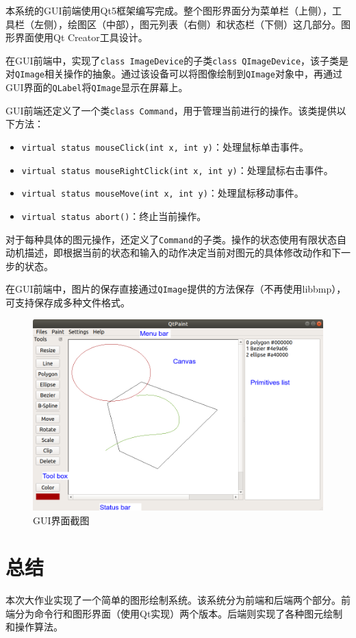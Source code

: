 \documentclass[a4paper,12pt]{article}
\begin{document}
本系统的GUI前端使用Qt5框架\cite{qtdoc}编写完成。整个图形界面分为菜单栏（上侧），工具栏（左侧），绘图区（中部），图元列表（右侧）和状态栏（下侧）这几部分。图形界面使用Qt Creator工具设计。

在GUI前端中，实现了\lstinline|class ImageDevice|的子类\lstinline|class QImageDevice|，该子类是对\lstinline|QImage|相关操作的抽象。通过该设备可以将图像绘制到\lstinline|QImage|对象中，再通过GUI界面的\lstinline|QLabel|将\lstinline|QImage|显示在屏幕上。

GUI前端还定义了一个类\lstinline|class Command|，用于管理当前进行的操作。该类提供以下方法：
\begin{itemize}
	\item \lstinline|virtual status mouseClick(int x, int y)|：处理鼠标单击事件。
	\item \lstinline|virtual status mouseRightClick(int x, int y)|：处理鼠标右击事件。
	\item \lstinline|virtual status mouseMove(int x, int y)|：处理鼠标移动事件。
	\item \lstinline|virtual status abort()|：终止当前操作。
\end{itemize}

对于每种具体的图元操作，还定义了\lstinline|Command|的子类。操作的状态使用有限状态自动机描述，即根据当前的状态和输入的动作决定当前对图元的具体修改动作和下一步的状态。

在GUI前端中，图片的保存直接通过\lstinline|QImage|提供的方法保存（不再使用libbmp），可支持保存成多种文件格式。

\begin{figure}[htb]
\centering
\includegraphics[width=\linewidth]{screenshot.png}	
\caption{GUI界面截图}
\end{figure}

\section{总结}
本次大作业实现了一个简单的图形绘制系统。该系统分为前端和后端两个部分。前端分为命令行和图形界面（使用Qt实现）两个版本。后端则实现了各种图元绘制和操作算法。

%

\end{document}
